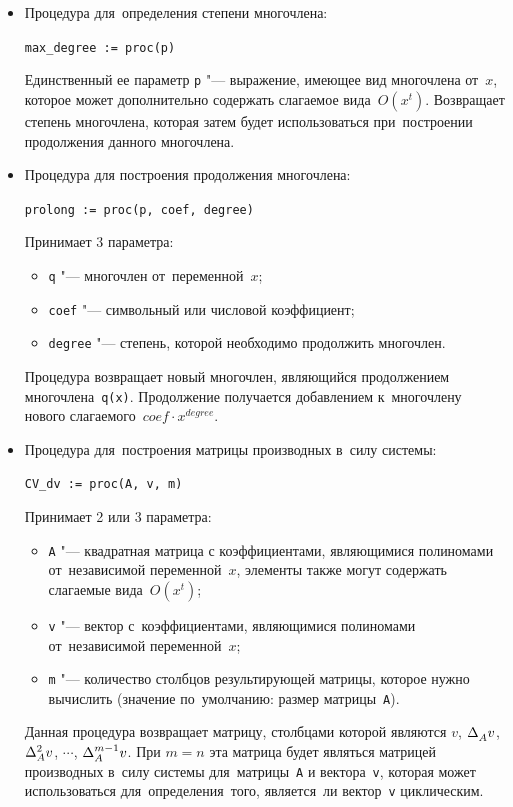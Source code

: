 \begin{itemize}
    \item
        Процедура для~определения степени многочлена:
        
        \verb|max_degree := proc(p)|

        Единственный ее параметр \verb|p| "--- выражение, имеющее вид многочлена от~$x$,
        которое может дополнительно содержать слагаемое вида~$O(x^t)$.
        Возвращает степень многочлена, которая затем будет использоваться при~построении продолжения данного многочлена.

    \item
        Процедура для построения продолжения многочлена:
        
        \verb|prolong := proc(p, coef, degree)|

        Принимает 3 параметра:
        \begin{itemize}
            \item
                \verb|q| "--- многочлен от~переменной~$x$;
            \item
                \verb|coef| "--- символьный или числовой коэффициент;
            \item
                \verb|degree| "--- степень, которой необходимо продолжить многочлен.
        \end{itemize}

        Процедура возвращает новый многочлен, являющийся продолжением многочлена~\verb|q(x)|.
        Продолжение получается добавлением к~многочлену нового слагаемого~$coef \cdot x^{degree}$.

    \item
        Процедура для~построения матрицы производных в~силу системы:
        
        \verb|CV_dv := proc(A, v, m)|
        
        \newpage
        Принимает 2 или 3 параметра:
        \begin{itemize}
            \item
                \verb|A| "--- квадратная матрица с коэффициентами, являющимися полиномами от~независимой переменной~$x$,
                элементы также могут содержать слагаемые вида~$O(x^t)$;
            \item
                \verb|v| "--- вектор с~коэффициентами, являющимися полиномами от~независимой переменной~$x$;
            \item
                \verb|m| "--- количество столбцов результирующей матрицы, которое нужно вычислить
                (значение по~умолчанию: размер матрицы~\verb|A|).
        \end{itemize}

        Данная процедура возвращает матрицу,
        столбцами которой являются $v$, $\diffVector$, $\diffVector[2]$, $\cdots$, $\diffVector[m-1]$.
        При $m=n$ эта матрица будет являться матрицей производных в~силу системы для~матрицы~\verb|A| и вектора~\verb|v|,
        которая может использоваться для~определения~того, является~ли вектор~\verb|v| циклическим.
\end{itemize}

